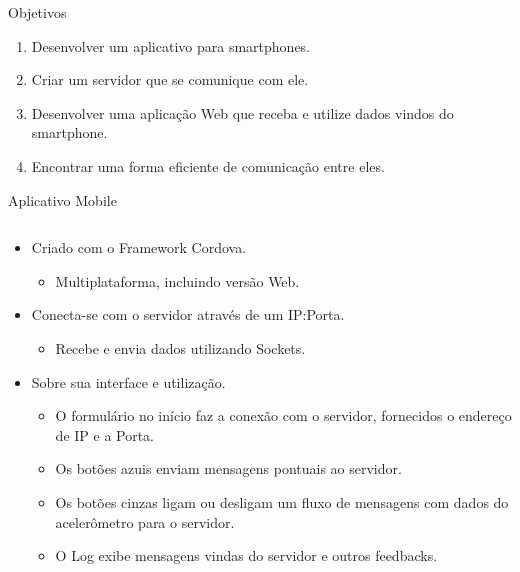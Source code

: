 \documentclass[final,hyperref={pdfpagelabels=false}]{beamer}
\begin{document}
\begin{frame}[t]
\begin{columns}[t]
\begin{column}{.465\textwidth}
\begin{block}{Objetivos}
\begin{enumerate}
\item Desenvolver um aplicativo para smartphones.
\item Criar um servidor que se comunique com ele.
\item Desenvolver uma aplicação Web que receba e utilize dados vindos do smartphone.
\item Encontrar uma forma eficiente de comunicação entre eles.
\end{enumerate}

\end{block}


\begin{block}{Aplicativo Mobile}

\begin{columns} %
\begin{column}{.54\textwidth} %

\begin{itemize}
\item Criado com o Framework Cordova.
\begin{itemize}
\item Multiplataforma, incluindo versão Web.
\end{itemize}
\item Conecta-se com o servidor através de um IP:Porta.
\begin{itemize}
\item Recebe e envia dados utilizando Sockets.
\end{itemize}
\end{itemize}

\begin{itemize}
\item Sobre sua interface e utilização.
\begin{itemize}
\item O formulário no início faz a conexão com o servidor, fornecidos o endereço de IP e a Porta.
\item Os botões azuis enviam mensagens pontuais ao servidor.
\item Os botões cinzas ligam ou desligam um fluxo de mensagens com dados do acelerômetro para o servidor.
\item O Log exibe mensagens vindas do servidor e outros feedbacks.
\end{itemize}
\end{itemize}


\end{column}
\end{columns}
\end{block}
\end{column}
\end{columns}
\end{frame}
\end{document}
